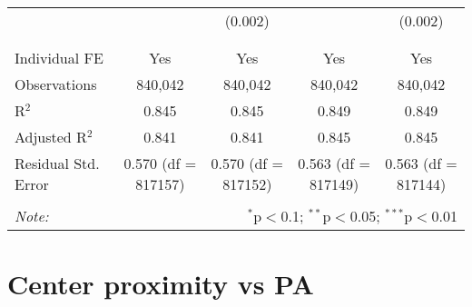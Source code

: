 \documentclass[
]{article}
\begin{document}
\begin{table}[!htbp]
{\begin{tabular}{@{\extracolsep{5pt}}lcccc}
  &  & (0.002) &  & (0.002) \\ 
  & & & & \\ 
\hline \\[-1.8ex] 
Individual FE & Yes & Yes & Yes & Yes \\ 
Observations & 840,042 & 840,042 & 840,042 & 840,042 \\ 
R$^{2}$ & 0.845 & 0.845 & 0.849 & 0.849 \\ 
Adjusted R$^{2}$ & 0.841 & 0.841 & 0.845 & 0.845 \\ 
Residual Std. Error & 0.570 (df = 817157) & 0.570 (df = 817152) & 0.563 (df = 817149) & 0.563 (df = 817144) \\ 
\hline 
\hline \\[-1.8ex] 
\textit{Note:}  & \multicolumn{4}{r}{$^{*}$p$<$0.1; $^{**}$p$<$0.05; $^{***}$p$<$0.01} \\ 
\end{tabular}
} 
\end{table} 
\newpage
\section{Center proximity vs PA}
\end{document}
